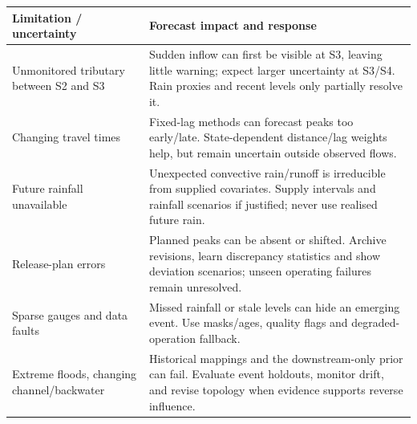 \documentclass[
  10pt,
  a4paper,
]{article}
\newcounter{none} %
\begin{document}
{\def\LTcaptype{none} %
\begin{longtable}[]{@{}
  >{\raggedright\arraybackslash}p{}
  >{\raggedright\arraybackslash}p{}@{}}
\toprule\noalign{}
\begin{minipage}[b]{\linewidth}\raggedright
Limitation / uncertainty
\end{minipage} & \begin{minipage}[b]{\linewidth}\raggedright
Forecast impact and response
\end{minipage} \\
\midrule\noalign{}
\endhead
\bottomrule\noalign{}
\endlastfoot
Unmonitored tributary between S2 and S3 & Sudden inflow can first be
visible at S3, leaving little warning; expect larger uncertainty at
S3/S4. Rain proxies and recent levels only partially resolve it. \\
Changing travel times & Fixed-lag methods can forecast peaks too
early/late. State-dependent distance/lag weights help, but remain
uncertain outside observed flows. \\
Future rainfall unavailable & Unexpected convective rain/runoff is
irreducible from supplied covariates. Supply intervals and rainfall
scenarios if justified; never use realised future rain. \\
Release-plan errors & Planned peaks can be absent or shifted. Archive
revisions, learn discrepancy statistics and show deviation scenarios;
unseen operating failures remain unresolved. \\
Sparse gauges and data faults & Missed rainfall or stale levels can hide
an emerging event. Use masks/ages, quality flags and degraded-operation
fallback. \\
Extreme floods, changing channel/backwater & Historical mappings and the
downstream-only prior can fail. Evaluate event holdouts, monitor drift,
and revise topology when evidence supports reverse influence. \\
\end{longtable}
}
\end{document}
